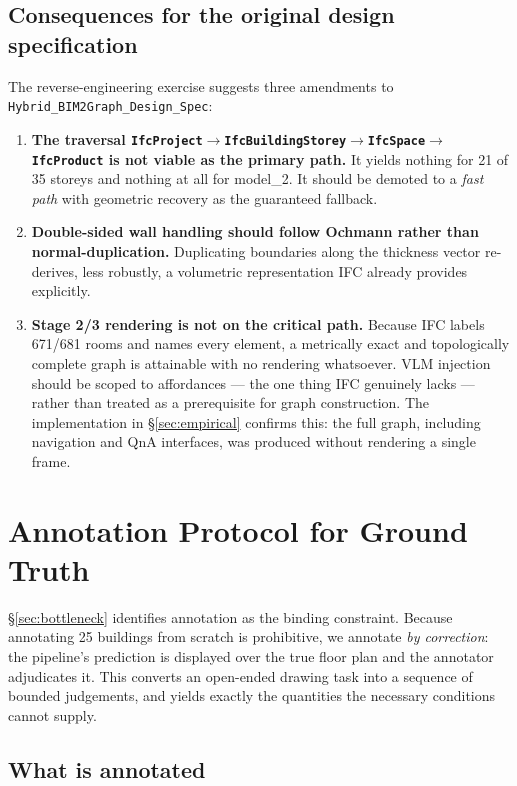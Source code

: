 \documentclass[10pt,twocolumn,letterpaper]{article}
\begin{document}
\subsection{Consequences for the original design specification}

The reverse-engineering exercise suggests three amendments to
\texttt{Hybrid\_BIM2Graph\_Design\_Spec}:

\begin{enumerate}\itemsep2pt
\item \textbf{The traversal
\texttt{IfcProject}$\rightarrow$\texttt{IfcBuildingStorey}$\rightarrow$\texttt{IfcSpace}$\rightarrow$\texttt{IfcProduct}
is not viable as the primary path.} It yields nothing for 21 of 35 storeys and
nothing at all for model\_2. It should be demoted to a \emph{fast path} with
geometric recovery as the guaranteed fallback.
\item \textbf{Double-sided wall handling should follow Ochmann
\cite{ochmann2016parametric} rather than normal-duplication.} Duplicating
boundaries along the thickness vector re-derives, less robustly, a volumetric
representation IFC already provides explicitly.
\item \textbf{Stage 2/3 rendering is not on the critical path.} Because IFC
labels 671/681 rooms and names every element, a metrically exact and
topologically complete graph is attainable with no rendering whatsoever. VLM
injection should be scoped to affordances --- the one thing IFC genuinely lacks
--- rather than treated as a prerequisite for graph construction. The
implementation in \S\ref{sec:empirical} confirms this: the full graph, including
navigation and QnA interfaces, was produced without rendering a single frame.
\end{enumerate}

\section{Annotation Protocol for Ground Truth}
\label{sec:annotation}

\S\ref{sec:bottleneck} identifies annotation as the binding constraint. Because
annotating 25 buildings from scratch is prohibitive, we annotate \emph{by
correction}: the pipeline's prediction is displayed over the true floor plan and
the annotator adjudicates it. This converts an open-ended drawing task into a
sequence of bounded judgements, and yields exactly the quantities the necessary
conditions cannot supply.

\subsection{What is annotated}
\end{document}
